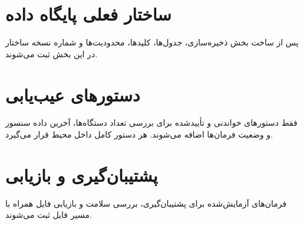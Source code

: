 \section{ساختار فعلی پایگاه داده}
پس از ساخت بخش ذخیره‌سازی، جدول‌ها، کلیدها، محدودیت‌ها و شماره نسخه ساختار در این بخش ثبت می‌شوند.

\section{دستورهای عیب‌یابی}
فقط دستورهای خواندنی و تأییدشده
برای بررسی تعداد دستگاه‌ها، آخرین داده سنسور و وضعیت فرمان‌ها اضافه می‌شوند. هر دستور کامل داخل محیط
قرار می‌گیرد.

\section{پشتیبان‌گیری و بازیابی}
فرمان‌های آزمایش‌شده برای پشتیبان‌گیری، بررسی سلامت و بازیابی فایل
همراه با مسیر فایل ثبت می‌شوند.
